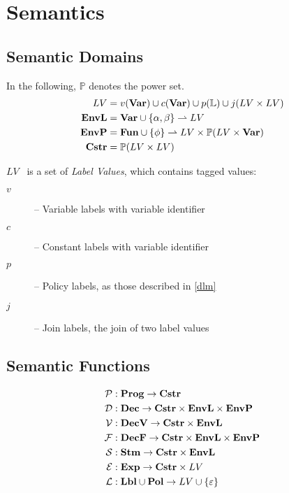 
\newcommand{\iP}{\mathcal{P}}
\newcommand{\iD}{\mathcal{D}}
\newcommand{\iV}{\mathcal{V}}
\newcommand{\iF}{\mathcal{F}}
\newcommand{\iS}{\mathcal{S}}
\newcommand{\iE}{\mathcal{E}}
\newcommand{\iL}{\mathcal{L}}
\newcommand{\iO}{\mathcal{O}}

\newcommand{\iLV}{LV}

\newcommand{\dblSq}[1]{[\![ #1 ]\!]}

\newcommand{\rspace}{\\[1em]}
\newcommand{\dsWhere}[1]{\quad \text{ where } #1}
\newcommand{\dsAnd}[1]{\quad \text{ and } #1}
\newcommand{\dsIf}[1]{\quad \text{ if } #1}

\section{Semantics}

\subsection{Semantic Domains}
In the following, $\mathbb P$ denotes the power set.
\begin{align*}
\iLV      & = v(\iVar) \cup c(\iVar) \cup p(\mathbb{L}) \cup j(\iLV \times \iLV) \\
\iEnvL  & = \iVar \cup \{ \ia, \ib \} \rightharpoonup \iLV \\
\iEnvP  & = \iFun \cup \{ \ifb \} \rightharpoonup \iLV \times \mathbb P (\iLV \times \iVar) \\
\iCstr  & = \mathbb P (\iLV \times \iLV)
\end{align*}

$\iLV$~ is a set of \emph{Label Values}, which contains tagged values:
\begin{description}
  \item[$v$] -- Variable labels with variable identifier
  \item[$c$] -- Constant labels with variable identifier
  \item[$p$] -- Policy labels, as those described in \cref{dlm}
  \item[$j$] -- Join labels, the join of two label values
\end{description}

\subsection{Semantic Functions}
\begin{align*}
\iP & : \iProg \rightarrow \iCstr \\
\iD & : \iDec \rightarrow \iCstr \times \iEnvL \times \iEnvP \\
\iV & : \iDecv \rightarrow \iCstr \times \iEnvL \\
\iF & : \iDecf \rightarrow \iCstr \times \iEnvL \times \iEnvP \\
\iS & : \iStm \rightarrow \iCstr \times \iEnvL \\
\iE & : \iExp \rightarrow \iCstr \times \iLV \\
\iL & : \iLbl \cup \iPol \rightarrow \iLV \cup \{ \varepsilon \}
\end{align*}

